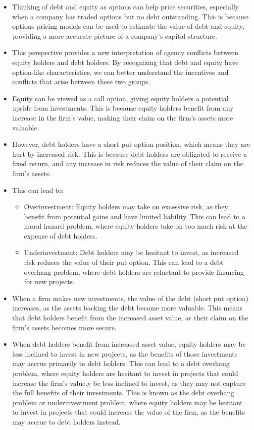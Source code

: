 \begin{itemize}
    \item Thinking of debt and equity as options can help price securities, especially when a company has traded options but no debt outstanding. This is because options pricing models can be used to estimate the value of debt and equity, providing a more accurate picture of a company's capital structure.
    \item This perspective provides a new interpretation of agency conflicts between equity holders and debt holders. By recognizing that debt and equity have option-like characteristics, we can better understand the incentives and conflicts that arise between these two groups.
    \item Equity can be viewed as a call option, giving equity holders a potential upside from investments. This is because equity holders benefit from any increase in the firm's value, making their claim on the firm's assets more valuable.
    \item However, debt holders have a short put option position, which means they are hurt by increased risk. This is because debt holders are obligated to receive a fixed return, and any increase in risk reduces the value of their claim on the firm's assets.
    \item This can lead to:
        \begin{itemize}
            \item Overinvestment: Equity holders may take on excessive risk, as they benefit from potential gains and have limited liability. This can lead to a moral hazard problem, where equity holders take on too much risk at the expense of debt holders.
            \item Underinvestment: Debt holders may be hesitant to invest, as increased risk reduces the value of their put option. This can lead to a debt overhang problem, where debt holders are reluctant to provide financing for new projects.
        \end{itemize}
    \item When a firm makes new investments, the value of the debt (short put option) increases, as the assets backing the debt become more valuable. This means that debt holders benefit from the increased asset value, as their claim on the firm's assets becomes more secure.
    \item When debt holders benefit from increased asset value, equity holders may be less inclined to invest in new projects, as the benefits of those investments may accrue primarily to debt holders. This can lead to a debt overhang problem, where equity holders are hesitant to invest in projects that could increase the firm's value.y be less inclined to invest, as they may not capture the full benefits of their investments. This is known as the debt overhang problem or underinvestment problem, where equity holders may be hesitant to invest in projects that could increase the value of the firm, as the benefits may accrue to debt holders instead.
\end{itemize}

